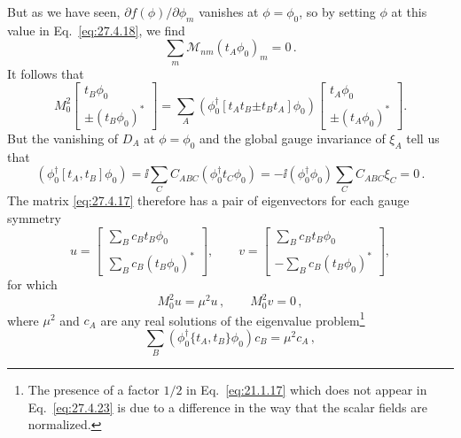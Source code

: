 But as we have seen, \(\partial f(\phi)/\partial\phi_m\) vanishes at
\(\phi=\phi_0\), so by setting \(\phi\) at this value in
Eq.~\eqref{eq:27.4.18}, we find
\begin{equation}
  \sum_m\mathcal{M}_{nm}(t_A\phi_0)_m=0\,.
  \tag{27.4.19}\label{eq:27.4.19}
\end{equation}
It follows that
\[
  M_0^2
  \begin{bmatrix}
    t_B\phi_0\\
    \mathord{\pm}(t_B\phi_0)^*
  \end{bmatrix}
  =
  \sum_A
  \left(\phi_0^\dagger[t_A t_B\mathord{\pm}t_B t_A]\phi_0\right)
  \begin{bmatrix}
    t_A\phi_0\\
    \mathord{\pm}(t_A\phi_0)^*
  \end{bmatrix}.
\]
But the vanishing of \(D_A\) at \(\phi=\phi_0\) and the global gauge
invariance of \(\xi_A\) tell us that
\begin{equation}
  \left(\phi_0^\dagger[t_A,t_B]\phi_0\right)
  =\ii\sum_C C_{ABC}\left(\phi_0^\dagger t_C\phi_0\right)
  =-\ii\left(\phi_0^\dagger\phi_0\right)
    \sum_C C_{ABC}\xi_C
  =0\,.
  \tag{27.4.20}\label{eq:27.4.20}
\end{equation}
The matrix \eqref{eq:27.4.17} therefore has a pair of eigenvectors for each
gauge symmetry
\begin{equation}
  u=
  \begin{bmatrix}
    \sum_Bc_Bt_B\phi_0\\
    \sum_Bc_B(t_B\phi_0)^*
  \end{bmatrix},
  \qquad
  v=
  \begin{bmatrix}
    \sum_Bc_Bt_B\phi_0\\
    -\sum_Bc_B(t_B\phi_0)^*
  \end{bmatrix},
  \tag{27.4.21}\label{eq:27.4.21}
\end{equation}
for which
\begin{equation}
  M_0^2u=\mu^2u\,,
  \qquad
  M_0^2v=0\,,
  \tag{27.4.22}\label{eq:27.4.22}
\end{equation}
where \(\mu^2\) and \(c_A\) are any real solutions of the eigenvalue
problem\footnote{The presence of a factor \(1/2\) in Eq.~\eqref{eq:21.1.17}
which does not appear in Eq.~\eqref{eq:27.4.23} is due to a difference in
the way that the scalar fields are normalized.}
\begin{equation}
  \sum_B
  \left(\phi_0^\dagger\{t_A,t_B\}\phi_0\right)c_B
  =\mu^2c_A\,,
  \tag{27.4.23}\label{eq:27.4.23}
\end{equation}
